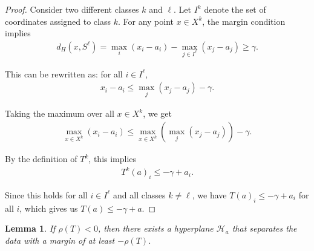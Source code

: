 \documentclass{article}
\newtheorem{lemma}[theorem]{Lemma}
\begin{document}
\begin{proof}
Consider two different classes $k$ and $\ell$. Let $I^k$ denote the set of coordinates assigned to class $k$. For any point $x \in X^k$, the margin condition implies
\begin{align}
d_H(x, S^{\ell}) = \max_i(x_i - a_i) - \max_{j \in I^{\ell}}(x_j - a_j) \geq \gamma.
\end{align}

This can be rewritten as: for all $i \in I^{\ell}$,
\begin{align}
x_i - a_i \leq \max_j(x_j - a_j) - \gamma.
\end{align}

Taking the maximum over all $x \in X^k$, we get
\begin{align}
\max_{x \in X^k}(x_i - a_i) \leq \max_{x \in X^k}(\max_j(x_j - a_j)) - \gamma.
\end{align}

By the definition of $T^k$, this implies
\begin{align}
T^k(a)_i \leq -\gamma + a_i.
\end{align}

Since this holds for all $i \in I^{\ell}$ and all classes $k \neq \ell$, we have $T(a)_i \leq -\gamma + a_i$ for all $i$, which gives us $T(a) \leq -\gamma + a$.
\end{proof}

\begin{lemma}\label{lemma:operator_to_hyperplane}
If $\rho(T) < 0$, then there exists a hyperplane $\mathcal{H}_a$ that separates the data with a margin of at least $-\rho(T)$.
\end{lemma}
\end{document}
